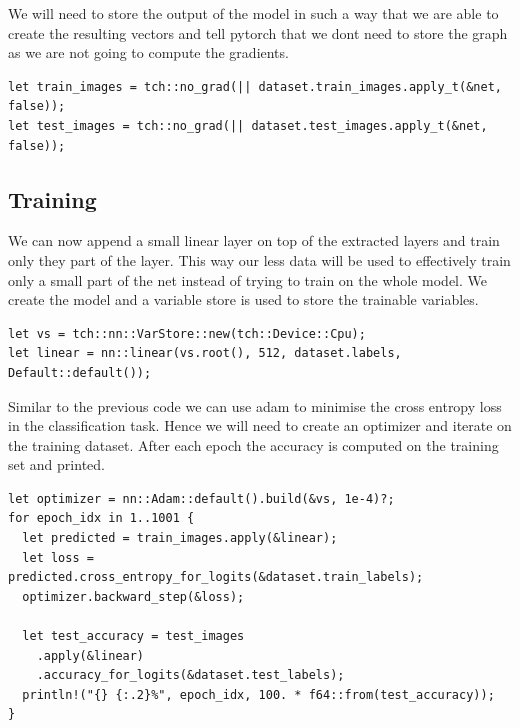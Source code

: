 \documentclass{book}
\begin{document}
We will need to store the output of the model in such a way that we are able to create the resulting vectors and tell pytorch that we dont need to store the graph as we are not going to compute the gradients.

\begin{lstlisting}[caption={https://github.com/LaurentMazare/tch-rs/blob/master/examples/transfer-learning/main.rs}, basicstyle=\small]
let train_images = tch::no_grad(|| dataset.train_images.apply_t(&net, false));
let test_images = tch::no_grad(|| dataset.test_images.apply_t(&net, false));
\end{lstlisting}

\subsection{Training}%
We can now append a small linear layer on top of the extracted layers and train only they part of the layer. This way our less data will be used to effectively train only a small part of the net instead of trying to train on the whole model. We create the model and a variable store is used to store the trainable variables.

\begin{lstlisting}[caption={https://github.com/LaurentMazare/tch-rs/blob/master/examples/transfer-learning/main.rs}, basicstyle=\small]
let vs = tch::nn::VarStore::new(tch::Device::Cpu);
let linear = nn::linear(vs.root(), 512, dataset.labels, Default::default());
\end{lstlisting}

Similar to the previous code we can use adam to minimise the cross entropy loss in the classification task. Hence we will need to create an optimizer and iterate on the training dataset. After each epoch the accuracy is computed on the training set and printed.

\begin{lstlisting}[caption={https://github.com/LaurentMazare/tch-rs/blob/master/examples/transfer-learning/main.rs}, basicstyle=\small]
let optimizer = nn::Adam::default().build(&vs, 1e-4)?;
for epoch_idx in 1..1001 {
  let predicted = train_images.apply(&linear);
  let loss = predicted.cross_entropy_for_logits(&dataset.train_labels);
  optimizer.backward_step(&loss);

  let test_accuracy = test_images
    .apply(&linear)
    .accuracy_for_logits(&dataset.test_labels);
  println!("{} {:.2}%", epoch_idx, 100. * f64::from(test_accuracy));
}
\end{lstlisting}
\end{document}
